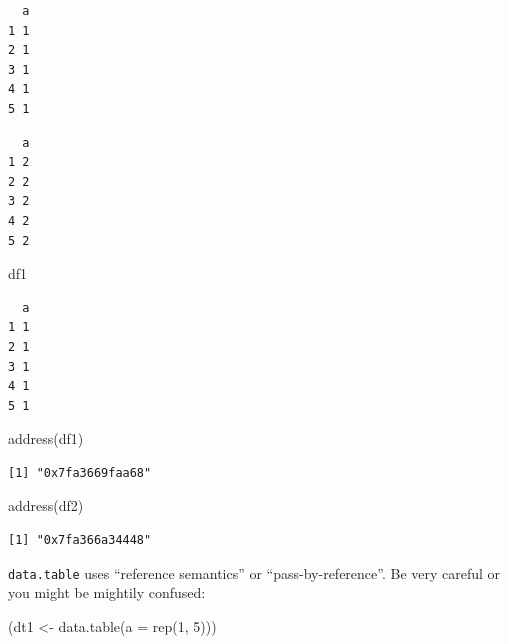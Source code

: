 \documentclass[
]{book}
\newenvironment{Shaded}{\begin{snugshade}}{\end{snugshade}}
\newcommand{\AttributeTok}[1]{\textcolor[rgb]{0.77,0.63,0.00}{#1}}
\newcommand{\DecValTok}[1]{\textcolor[rgb]{0.00,0.00,0.81}{#1}}
\newcommand{\FunctionTok}[1]{\textcolor[rgb]{0.00,0.00,0.00}{#1}}
\newcommand{\NormalTok}[1]{#1}
\newcommand{\OtherTok}[1]{\textcolor[rgb]{0.56,0.35,0.01}{#1}}
\newcommand{\SpecialCharTok}[1]{\textcolor[rgb]{0.00,0.00,0.00}{#1}}
\begin{document}
\begin{verbatim}
  a
1 1
2 1
3 1
4 1
5 1
\end{verbatim}

\begin{Shaded}
\end{Shaded}

\begin{verbatim}
  a
1 2
2 2
3 2
4 2
5 2
\end{verbatim}

\begin{Shaded}
\begin{Highlighting}[]
\NormalTok{df1}
\end{Highlighting}
\end{Shaded}

\begin{verbatim}
  a
1 1
2 1
3 1
4 1
5 1
\end{verbatim}

\begin{Shaded}
\begin{Highlighting}[]
\FunctionTok{address}\NormalTok{(df1)}
\end{Highlighting}
\end{Shaded}

\begin{verbatim}
[1] "0x7fa3669faa68"
\end{verbatim}

\begin{Shaded}
\begin{Highlighting}[]
\FunctionTok{address}\NormalTok{(df2)}
\end{Highlighting}
\end{Shaded}

\begin{verbatim}
[1] "0x7fa366a34448"
\end{verbatim}

\texttt{data.table} uses ``reference semantics'' or ``pass-by-reference''. Be very careful or you might be mightily confused:

\begin{Shaded}
\begin{Highlighting}[]
\NormalTok{(dt1 }\OtherTok{\textless{}{-}} \FunctionTok{data.table}\NormalTok{(}\AttributeTok{a =} \FunctionTok{rep}\NormalTok{(}\DecValTok{1}\NormalTok{, }\DecValTok{5}\NormalTok{)))}
\end{Highlighting}
\end{Shaded}
\end{document}
